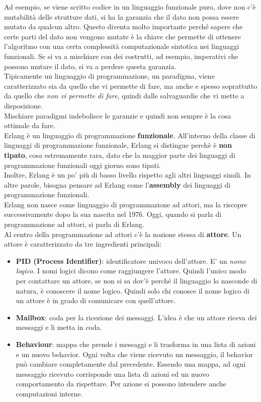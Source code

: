 \documentclass{article}
\begin{document}
Ad esempio, se viene scritto codice in un linguaggio funzionale puro, dove non c'è mutabilità delle strutture dati, si ha la garanzia che il dato non possa essere mutato da qualcun altro. Questo diventa molto importante perché sapere che certe parti del dato non vengono mutate è la chiave che permette di ottenere l'algoritmo con una certa complessità computazionale sintotica nei linguaggi funzionali. Se
si va a mischiare con dei costrutti, ad esempio, imperativi che possono mutare il dato, si va a perdere questa garanzia.\vspace{14pt}\\
Tipicamente un linguaggio di programmazione, un paradigma, viene caratterizzato sia da quello che vi permette di fare, ma anche e spesso soprattutto da quello che \textit{non vi permette di fare}, quindi dalle salvaguardie che vi mette a disposizione.\\
Mischiare paradigmi indebolisce le garanzie e quindi non sempre è la cosa ottimale da fare.\vspace{14pt}\\
Erlang è un linguaggio di programmazione \textbf{funzionale}. All'interno della classe di linguaggi di programmazione funzionale, Erlang si distingue perchè è \textbf{non tipato}, cosa estremamente rara, dato che la maggior parte dei linguaggi di programmazione funzionali oggi giorno sono tipati.\\
Inoltre, Erlang è un po' più di basso livello rispetto agli altri linguaggi simili. In altre parole, bisogna pensare ad Erlang come l'\textbf{assembly} dei linguaggi di programmazione funzionali.\vspace{14pt}\\
Erlang non nasce come linguaggio di programmazione ad attori, ma la riscopre successivamente dopo la sua nascita nel 1976. Oggi, quando si parla di programmazione ad attori, si parla di Erlang.\vspace{14pt}\\
Al centro della programmazione ad attori c'è la nozione stessa di \textbf{attore}. Un attore è caratterizzato da tre ingredienti principali:
\begin{itemize}
    \item \textbf{PID (Process Identifier)}: identificatore univoco dell'attore. E' un \textit{nome logico}. I nomi logici dicono come raggiungere l'attore. Quindi l'unico modo per contattare un attore, se non si sa dov'è perché il linguaggio lo nasconde di natura, è conoscere il nome logico. Quindi solo chi conosce il nome logico di un attore è in grado di comunicare con quell'attore.
    \item \textbf{Mailbox}: coda per la ricezione dei messaggi. L'idea è che un attore riceva dei messaggi e li metta in coda.
    \item \textbf{Behaviour}: mappa che prende i messaggi e li trasforma in una lista di azioni e un nuovo behavior. Ogni volta che viene ricevuto un messaggio, il behavior può cambiare completamente dal precedente. Essendo una mappa, ad ogni messaggio ricevuto corrisponde una lista di azioni ed un nuovo comportamento da rispettare. Per azione si possono intendere anche computazioni interne.
\end{itemize}
\end{document}
